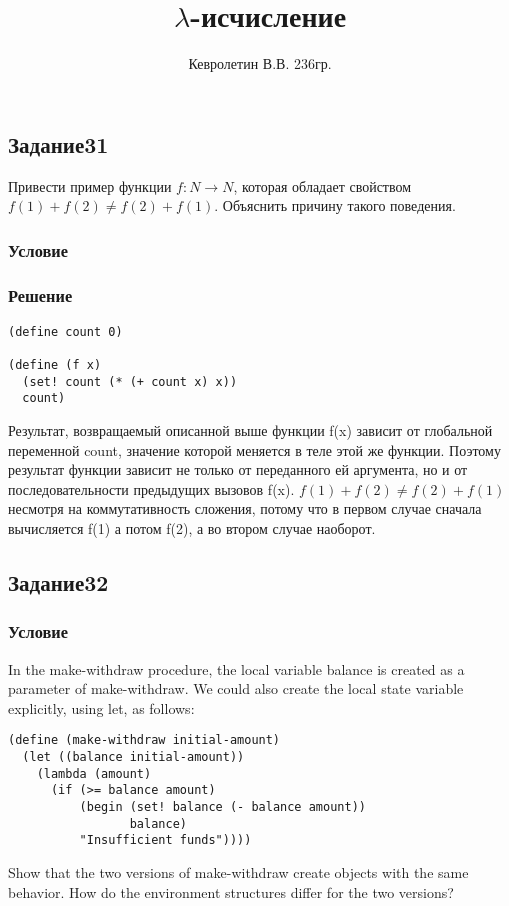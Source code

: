 \documentclass[10pt,a4paper]{article}
\author{Кевролетин В.В. 236гр.}
\title{$\lambda$-исчисление}
\begin{document}
\maketitle

\subsection*{Задание31}
Привести пример функции $f:N\rightarrow N$, которая обладает свойством
$f(1)+f(2)\not =f(2)+f(1)$. Объяснить причину такого поведения.
\subsubsection*{Условие}
\subsubsection*{Решение}
\begin{lstlisting}
(define count 0)

(define (f x)
  (set! count (* (+ count x) x))
  count)
\end{lstlisting}

Результат, возвращаемый описанной выше функции f(x) зависит от
глобальной переменной
count, значение которой меняется в теле этой же функции. Поэтому
результат функции зависит не только от переданного ей аргумента, но и
от
последовательности предыдущих вызовов f(x).
$f(1)+f(2)\not =f(2)+f(1)$ несмотря на коммутативность сложения,
потому что в первом случае сначала вычисляется f(1) а потом f(2), а во
втором случае наоборот.

\subsection*{Задание32}
\subsubsection*{Условие}
In the make-withdraw procedure, the local variable balance is created
as a parameter of make-withdraw. We could also create the local state
variable explicitly, using let, as follows:
\begin{lstlisting}
(define (make-withdraw initial-amount)
  (let ((balance initial-amount))
    (lambda (amount)
      (if (>= balance amount)
          (begin (set! balance (- balance amount))
                 balance)
          "Insufficient funds"))))
\end{lstlisting}
Show that the two versions of make-withdraw create objects with the
same behavior. How do the environment structures differ for the two
versions?
\end{document}
